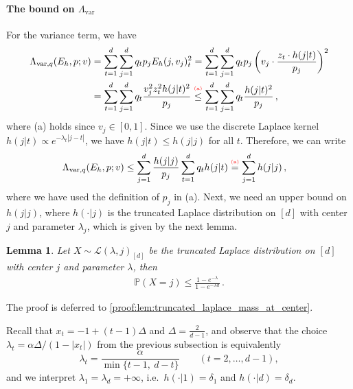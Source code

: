 \documentclass{article}
\theoremstyle{plain}
\newtheorem{lemma}[theorem]{Lemma}
\theoremstyle{definition}
\theoremstyle{plain}
\newcommand{\cL}{\mathcal L}
\newcommand{\abovelabel}[1]{\stackrel{\raisebox{0.5mm}{\textrm{\tiny \color{red} #1}}}}
\begin{document}
\paragraph{The bound on $\Lambda_{\mathrm{var}}$}
For the variance term, we have
\begin{align}
    \Lambda_{\text{var}, q}(E_h, p ; v)
     & =
    \sum_{t=1}^d \sum_{j=1}^d q_t p_j E_h(j, v_j)_t^2
    = \sum_{t=1}^d \sum_{j=1}^d q_t p_j \left(v_j \cdot \frac{z_t \cdot h(j|t)}{p_j}\right)^2 \\
     & = \sum_{t=1}^d \sum_{j=1}^d q_t \frac{v_j^2 z_t^2 h(j|t)^2}{p_j}
    \abovelabel{(a)}{\leq} \sum_{t=1}^d \sum_{j=1}^d q_t \frac{ h(j|t)^2}{p_j}\,,
\end{align}
where (a) holds since $v_j\in[0,1]$.
Since we use the discrete Laplace kernel $h(j|t) \propto e^{-\lambda_t |j-t|}$, we have $h(j|t) \leq h(j|j)$ for all $t$.
Therefore, we can write
\begin{align}
    \Lambda_{\text{var}, q}(E_h, p; v)
     & \le \sum_{j=1}^d \frac{h(j|j)}{p_j}\sum_{t=1}^d q_t h(j|t)
    \abovelabel{(a)}{=} \sum_{j=1}^d h(j|j)\,,
\end{align}
where we have used the definition of $p_j$ in (a).
Next, we need an upper bound on $h(j|j)$, where $h(\cdot|j)$ is the truncated Laplace distribution on $[d]$ with center $j$ and parameter $\lambda_j$, which is given by the next lemma.
\begin{lemma}
    \label{lem:truncated_laplace_mass_at_center}
    Let $X \sim \cL(\lambda, j)_{[d]}$ be the truncated Laplace distribution on $[d]$ with center $j$ and parameter $\lambda$, then
    \begin{align}
        \mathbb{P}(X=j) \le \frac{1-e^{-\lambda}}{1-e^{-\lambda d}}\,.
    \end{align}
\end{lemma}
\noindent The proof is deferred to \ref{proof:lem:truncated_laplace_mass_at_center}.

Recall that $x_t = -1 + (t-1)\Delta$ and $\Delta = \frac{2}{d-1}$,
and observe that the choice $\lambda_t=\alpha\Delta/(1-|x_t|)$ from the previous subsection is equivalently
\begin{equation}
    \lambda_t=\frac{\alpha}{\min\{t-1,\ d-t\}}
    \qquad (t=2,\ldots,d-1),
    \label{eq:lambda_by_distance_to_boundary}
\end{equation}
and we interpret $\lambda_1=\lambda_d=+\infty$, i.e.\ $h(\cdot|1)=\delta_1$ and $h(\cdot|d)=\delta_d$.
\end{document}
